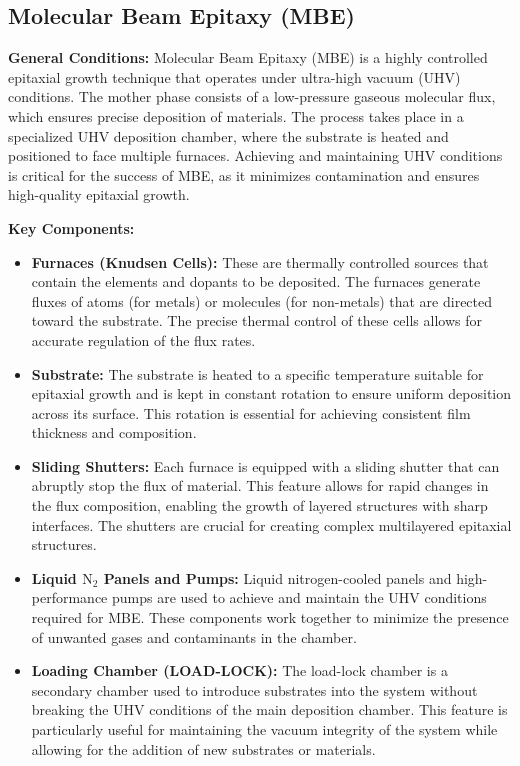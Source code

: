\documentclass{report}
\begin{document}
\subsection{Molecular Beam Epitaxy (MBE)}
\textbf{General Conditions:} Molecular Beam Epitaxy (MBE) is a highly controlled epitaxial growth technique that operates under ultra-high vacuum (UHV) conditions. The mother phase consists of a low-pressure gaseous molecular flux, which ensures precise deposition of materials. The process takes place in a specialized UHV deposition chamber, where the substrate is heated and positioned to face multiple furnaces. Achieving and maintaining UHV conditions is critical for the success of MBE, as it minimizes contamination and ensures high-quality epitaxial growth.

\textbf{Key Components:}
\begin{itemize}
    \item \textbf{Furnaces (Knudsen Cells):} These are thermally controlled sources that contain the elements and dopants to be deposited. The furnaces generate fluxes of atoms (for metals) or molecules (for non-metals) that are directed toward the substrate. The precise thermal control of these cells allows for accurate regulation of the flux rates.
    \item \textbf{Substrate:} The substrate is heated to a specific temperature suitable for epitaxial growth and is kept in constant rotation to ensure uniform deposition across its surface. This rotation is essential for achieving consistent film thickness and composition.
    \item \textbf{Sliding Shutters:} Each furnace is equipped with a sliding shutter that can abruptly stop the flux of material. This feature allows for rapid changes in the flux composition, enabling the growth of layered structures with sharp interfaces. The shutters are crucial for creating complex multilayered epitaxial structures.
    \item \textbf{Liquid $\text{N}_2$ Panels and Pumps:} Liquid nitrogen-cooled panels and high-performance pumps are used to achieve and maintain the UHV conditions required for MBE. These components work together to minimize the presence of unwanted gases and contaminants in the chamber.
    \item \textbf{Loading Chamber (LOAD-LOCK):} The load-lock chamber is a secondary chamber used to introduce substrates into the system without breaking the UHV conditions of the main deposition chamber. This feature is particularly useful for maintaining the vacuum integrity of the system while allowing for the addition of new substrates or materials.
\end{itemize}
\end{document}
